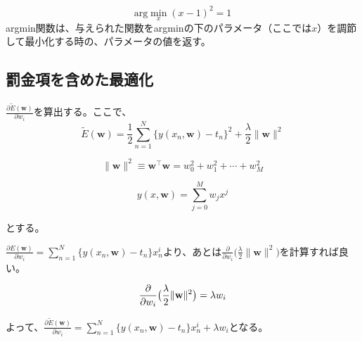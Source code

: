 \begin{equation*}
	\mathrm{arg}\!\min_{x} (x-1)^2 = 1
\end{equation*}
argmin関数は、与えられた関数をargminの下のパラメータ（ここでは$x$）を調節して最小化する時の、パラメータの値を返す。

\subsection*{罰金項を含めた最適化}
$\frac{\partial \tilde{E}(\mathbf{w}) }{\partial w_i}$を算出する。ここで、
\begin{equation*}
	\tilde{E}(\mathbf{w}) = \frac{1}{2} \sum_{n=1}^N \{  y(x_n, \mathbf{w}) - t_n \}^2 + \frac{\lambda}{2} \| \mathbf{w} \| ^ 2
\end{equation*}

\begin{equation*}
	\| \mathbf{w} \|^2 \equiv \mathbf{w}^{\top} \mathbf{w} = w_0^2 + w_1^2 + \cdots + w_M^2
\end{equation*}

\begin{equation*}
	y(x, \mathbf{w} ) = \sum_{j=0}^M w_j x^j
\end{equation*}

とする。


$\frac{\partial {E}(\mathbf{w}) }{\partial w_i} = \sum_{n=1}^N \{y(x_n, \mathbf{w}) - t_n \} x_n^i$より、あとは$\frac{\partial}{\partial w_i} \big( \frac{\lambda}{2} \| \mathbf{w} \| ^ 2 \big)$を計算すれば良い。

\begin{dmath*}
	\frac{\partial}{\partial w_i} \big( \frac{\lambda}{2} \| \mathbf{w} \| ^ 2 \big) \\
	= {\lambda}  w_i
\end{dmath*}

よって、$\frac{\partial \tilde{E}(\mathbf{w}) }{\partial w_i} = \sum_{n=1}^N \{y(x_n, \mathbf{w}) - t_n \} x_n^i + {\lambda}  w_i$となる。

